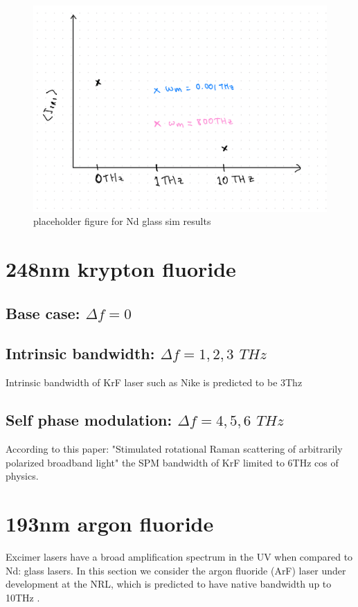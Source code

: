 \begin{figure}[ht]
   \centering
    \includegraphics[width=0.75\columnwidth]{Chapters/C5_broadband/ndglass_placeholder.jpeg}
    \caption{placeholder figure for Nd glass sim results}
    \label{fig:NdGlass}
\end{figure}{}

\section{248nm krypton fluoride}\label{sec:248}

\subsection{Base case: $\Delta f=0$}

\subsection{Intrinsic bandwidth: $\Delta f=1,2,3$ $\si{THz}$}
Intrinsic bandwidth of KrF laser such as Nike is predicted to be 3Thz \citep{Obenschain15}

\subsection{Self phase modulation: $\Delta f=4,5,6$ $\si{THz}$}

According to this paper: "Stimulated rotational Raman scattering of arbitrarily polarized broadband light" \citep{Lehmberg2020} the SPM bandwidth of KrF limited to 6THz cos of physics.

\section{193nm argon fluoride}\label{sec:193}
Excimer lasers have a broad amplification spectrum in the UV when compared to Nd: glass lasers. In this section we consider the argon fluoride (ArF) laser under development at the NRL, which is predicted to have native bandwidth up to 10THz \citep{Obenschain2020}.


